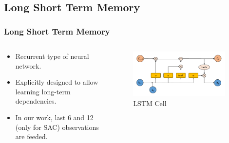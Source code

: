 \documentclass{beamer}
\begin{document}
\subsection{Long Short Term Memory}
\begin{frame}
\frametitle{Long Short Term Memory}
\begin{columns}[onlytextwidth]
	\begin{column}{.49\textwidth}
		\begin{itemize}
			\item Recurrent type of neural network.
			\item Explicitly designed to allow learning long-term dependencies.
			\item In our work, last 6 and 12 (only for SAC) observations are feeded. 
		\end{itemize}
	\end{column}
	\begin{column}{.49\textwidth}
		\begin{figure}
			\centering
			\includegraphics[width=0.95\textwidth]{figures/ml_theory/lstm_cell.png}
			\caption{LSTM Cell}
			\label{fig:lstm_cell}
		\end{figure}
	\end{column}
\end{columns}
\end{frame}

\end{document}
